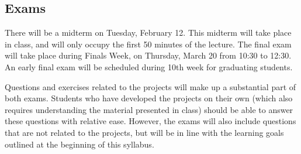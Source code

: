 \documentclass[11pt]{article}
\begin{document}
\subsection{Exams}

There will be a midterm on Tuesday, February 12. This midterm will take place in class, and will only occupy the first 50 minutes of the lecture. The final exam will take place during Finals Week, on Thursday, March 20 from 10:30 to 12:30. An early final exam will be scheduled during 10th week for graduating students.

Questions and exercises related to the projects will make up a substantial part of both exams. Students who have developed the projects on their own (which also requires understanding the material presented in class) should be able to answer these questions with relative ease. However, the exams will also include questions that are not related to the projects, but will be in line with the learning goals outlined at the beginning of this syllabus.
\end{document}
